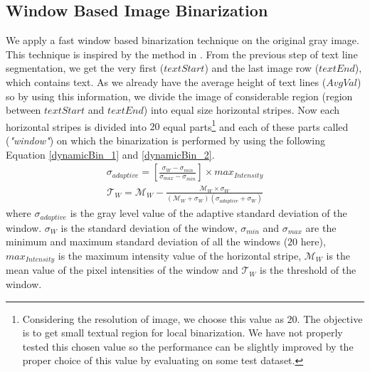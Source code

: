 \documentclass[runningheads]{llncs}
\begin{document}
\subsection {Window Based Image Binarization } \label{windowBasedBin} We apply a fast window based binarization technique on the original gray image. This technique is inspired by the method in \cite{Bataineh2011}. From the previous step of text line segmentation, we get the very first ($textStart$) and the last image row ($textEnd$), which contains text. As we already have the average height of text lines ($AvgVal$) so by using this information, we divide the image of considerable region (region between $textStart$ and $textEnd$) into equal size horizontal stripes. Now each horizontal stripes is divided into $20$ equal parts\footnote{Considering the resolution of image, we choose this value as $20$. The objective is to get small textual region for local binarization. We have not properly tested this chosen value so the performance can be slightly improved by the proper choice of this value by evaluating on some test dataset.} and each of these parts called (\textit{"window"}) on which the binarization is performed by using the following Equation \ref {dynamicBin_1} and \ref{dynamicBin_2}.
\begin{equation}
\begin{split}
\sigma_{adaptive} = [\frac{\sigma_{W} - \sigma_{min}}{\sigma_{max} - \sigma_{min}}] \times max_{Intensity}
\end{split} 
\label{dynamicBin_1}
\end{equation}
\begin{equation}
\begin{split}
\mathcal{T}_{W} = \mathcal{M}_{W} - \frac{\mathcal{M}_{W} \times \sigma_{W}}{(\mathcal{M}_{W} + \sigma_{W}) (\sigma_{adaptive} + \sigma_{W})}
\end{split} 
\label{dynamicBin_2}
\end{equation}
where $\sigma_{adaptive}$ is the gray level value of the adaptive standard deviation of the window. $\sigma_{W}$ is the standard deviation of the window, $\sigma_{min}$ and $\sigma_{max}$ are the minimum  and maximum standard deviation of all the windows ($20$ here), $max_{Intensity}$ is the maximum intensity value of the horizontal stripe, $\mathcal{M}_{W}$ is the mean value of the pixel intensities of the window and $\mathcal{T}_{W}$ is the threshold of the window.  
\end{document}

